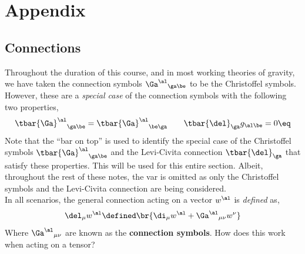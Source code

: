 \documentclass{article}
\begin{document}
\newpage
\section*{Appendix}
\setcounter{subsection}{0}
\setcounter{subsubsection}{0}
\renewcommand*{\theHsubsection}{appendix.\the\value{subsection}}
\renewcommand{\thesubsection}{\Alph{subsection}}
\subsection{Connections}
\label{sec:connections}
Throughout the duration of this course, and in most working theories of gravity, we have taken the connection symbols ${\Ga^\al}_{\ga\be}$ to be the Christoffel symbols. However, these are a \textit{special case} of the connection symbols with the following two properties,
\[ {\tbar{\Ga}^\al}_{\ga\be} = {\tbar{\Ga}^\al}_{\be\ga} \qquad \tbar{\del}_\ga g_{\al\be} = 0 \eq \label{eq:Christoffelproperties}\]
Note that the ``bar on top'' is used to identify the special case of the Christoffel symbols ${\tbar{\Ga}^\al}_{\ga\be}$ and the Levi-Civita connection $\tbar{\del}_\ga$ that satisfy these properties. This will be used for this entire section. Albeit, throughout the rest of these notes, the var is omitted as only the Christoffel symbols and the Levi-Civita connection are being considered.\\

In all scenarios, the general connection acting on a vector $w^\al$ is \textit{defined} as,
\[ \del_\mu w^\al \defined \br{\di_\mu w^\al + {\Ga^\al}_{\mu\nu} w^\nu} \]
Where ${\Ga^\al}_{\mu\nu}$ are known as the \textbf{connection symbols}. How does this work when acting on a tensor? \\
\end{document}
